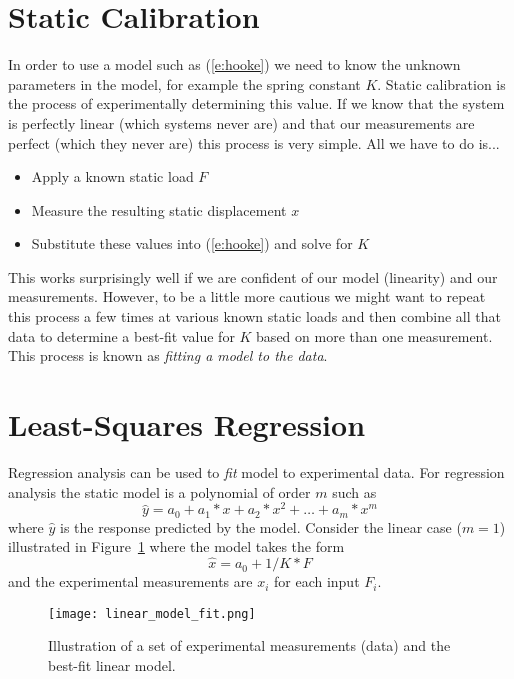 \section{Static Calibration}
In order to use a model such as (\ref{e:hooke}) we need to know the unknown parameters in the model, for example the spring constant $K$.  Static calibration is the process of experimentally determining this value.  If we know that the system is perfectly linear (which systems never are) and that our measurements are perfect (which they never are) this process is very simple.  All we have to do is...
\begin{itemize}
\item Apply a known static load $F$
\item Measure the resulting static displacement $x$
\item Substitute these values into (\ref{e:hooke}) and solve for $K$
\end{itemize}
This works surprisingly well if we are confident of our model (linearity) and our measurements.  However, to be a little more cautious we might want to repeat this process a few times at various known static loads and then combine all that data to determine a best-fit value for $K$ based on more than one measurement.  This process is known as \emph{fitting a model to the data}.

\section{Least-Squares Regression}
Regression analysis can be used to \emph{fit} model to experimental data.  For regression analysis the static model is a polynomial of order $m$ such as
\begin{equation}\label{e:rmodel}
\hat{y} = a_0+a_1*x+a_2*x^2+\ldots+a_m*x^m
\end{equation}
where $\hat{y}$ is the response predicted by the model.  Consider the linear case ($m=1$) illustrated in Figure~\ref{f:linear} where the model takes the form
\begin{equation}
\hat{x} = a_0 + 1/K*F
\end{equation}
and the experimental measurements are $x_i$ for each input $F_i$.  

\begin{figure}[hb!]
\centerline{
{\texttt{[image: linear\_model\_fit.png]}}}
\caption{Illustration of a set of experimental measurements (data) and the best-fit linear model.}
\label{f:linear}
\end{figure}


